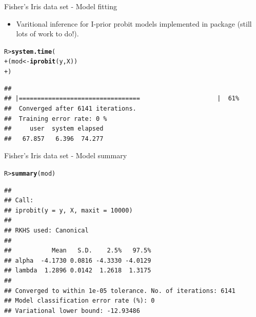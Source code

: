 \documentclass{beamer}\usepackage[]{graphicx}\usepackage[]{color}
\makeatletter
\newcommand{\hlstd}[1]{\textcolor[rgb]{0.345,0.345,0.345}{#1}}%
\newcommand{\hlkwb}[1]{\textcolor[rgb]{0.69,0.353,0.396}{#1}}%
\newcommand{\hlkwd}[1]{\textcolor[rgb]{0.737,0.353,0.396}{\textbf{#1}}}%
\newenvironment{kframe}{%
 \def\at@end@of@kframe{}%
 \ifinner\ifhmode%
  \def\at@end@of@kframe{\end{minipage}}%
  \begin{minipage}{\columnwidth}%
 \fi\fi%
 \def\FrameCommand##1{\hskip\@totalleftmargin \hskip-\fboxsep
 \colorbox{shadecolor}{##1}\hskip-\fboxsep
     \hskip-\linewidth \hskip-\@totalleftmargin \hskip\columnwidth}%
 \MakeFramed {\advance\hsize-\width
   \@totalleftmargin\z@ \linewidth\hsize
   \@setminipage}}%
 {\par\unskip\endMakeFramed%
 \at@end@of@kframe}
\newenvironment{knitrout}{}{} %
\makeatother
\begin{document}
\begin{frame}[fragile]{Fisher's Iris data set - Model fitting}
\vspace{-13pt}
\begin{itemize}
\item Varitional inference for I-prior probit models implemented in  package  (still lots of work to do!).
\end{itemize}
\begin{knitrout}\small
{}\color{fgcolor}\begin{kframe}
\begin{alltt}
\hlstd{R> }\hlkwd{system.time}\hlstd{(}
\hlstd{+ }  \hlstd{(mod} \hlkwb{<-} \hlkwd{iprobit}\hlstd{(y, X))}
\hlstd{+ }\hlstd{)}
\end{alltt}
\end{kframe}
\end{knitrout}
\vspace{-25pt}
\begin{knitrout}\small
{}\color{fgcolor}\begin{kframe}
\begin{alltt}
\vspace{0.8em}
\end{alltt}
\end{kframe}
\end{knitrout}
\vspace{-25pt}
\begin{knitrout}\small
{}\color{fgcolor}\begin{kframe}
\begin{verbatim}
## 
## |=================================                     |  61%
##  Converged after 6141 iterations.
##  Training error rate: 0 %
##     user  system elapsed
##   67.857   6.396  74.277
\end{verbatim}
\end{kframe}
\end{knitrout}

\end{frame}

\begin{frame}[fragile]{Fisher's Iris data set - Model summary}
\begin{knitrout}\small
{}\color{fgcolor}\begin{kframe}
\begin{alltt}
\hlstd{R> }\hlkwd{summary}\hlstd{(mod)}
\end{alltt}
\begin{verbatim}
## 
## Call:
## iprobit(y = y, X, maxit = 10000)
## 
## RKHS used: Canonical 
## 
##           Mean   S.D.    2.5%   97.5%
## alpha  -4.1730 0.0816 -4.3330 -4.0129
## lambda  1.2896 0.0142  1.2618  1.3175
## 
## Converged to within 1e-05 tolerance. No. of iterations: 6141
## Model classification error rate (%): 0
## Variational lower bound: -12.93486
\end{verbatim}
\end{kframe}
\end{knitrout}
\end{frame}
\end{document}
